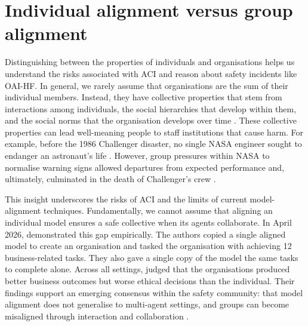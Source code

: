\section{Individual alignment versus group alignment} \label{S2}

Distinguishing between the properties of individuals and organisations helps us understand the risks associated with ACI and reason about safety incidents like OAI-HF. In general, we rarely assume that organisations are the sum of their individual members. Instead, they have collective properties that stem from interactions among individuals, the social hierarchies that develop within them, and the social norms that the organisation develops over time \parencite{durkheim1895}. These collective properties can lead well-meaning people to staff institutions that cause harm. For example, before the 1986 Challenger disaster, no single NASA engineer sought to endanger an astronaut’s life \parencite{vaughan1996}. However, group pressures within NASA to normalise warning signs allowed departures from expected performance and, ultimately, culminated in the death of Challenger’s crew \parencite{vaughan1996}.

This insight underscores the risks of ACI and the limits of current model-alignment techniques. Fundamentally, we cannot assume that aligning an individual model ensures a safe collective when its agents collaborate. In April 2026, \textcite{shen_ai_2026} demonstrated this gap empirically. The authors copied a single aligned model to create an organisation and tasked the organisation with achieving 12 business-related tasks. They also gave a single copy of the model the same tasks to complete alone. Across all settings, \textcite{shen_ai_2026} judged that the organisations produced better business outcomes but worse ethical decisions than the individual. Their findings support an emerging consensus within the safety community: that model alignment does not generalise to multi-agent settings, and groups can become misaligned through interaction and collaboration \parencite{hammond2025}.

